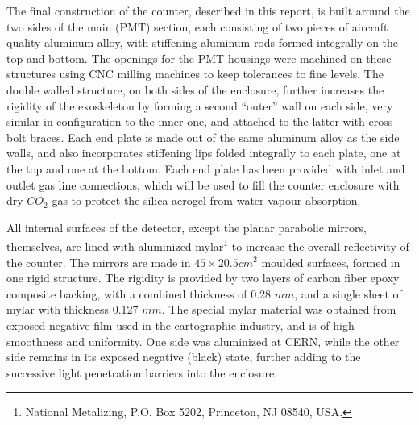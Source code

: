 The final construction of the counter, described in this report, is built
around the two sides of the main (PMT) section, each consisting of two pieces
of aircraft quality aluminum alloy, with stiffening aluminum rods formed
integrally on the top and bottom.  
The openings for the PMT housings were machined on these structures using CNC 
milling machines to keep tolerances to fine levels.  
The double walled structure, on both sides of the enclosure, further increases 
the rigidity of the exoskeleton by forming a second ``outer'' wall on each side, 
very similar in configuration to the inner one, and attached to the latter with 
cross-bolt braces.
Each end plate is made out of the same aluminum alloy as the side walls, and
also incorporates stiffening lips folded integrally to each plate, one at the
top and one at the bottom.  Each end plate has been provided with inlet and
outlet gas line connections, which will be used to fill the counter enclosure
with dry $CO_2$ gas to protect the silica aerogel from water vapour absorption.

All internal surfaces of the detector, except the planar parabolic mirrors,
themselves, are lined with aluminized 
mylar\footnote{National Metalizing, P.O. Box 5202, Princeton, NJ 08540, USA.} 
to increase the overall reflectivity of the counter.  
The mirrors are made in $45\times 20.5 cm^2$ moulded surfaces, formed in one 
rigid structure. 
The rigidity is provided by two layers of carbon fiber epoxy composite backing, 
with a combined thickness of 0.28 $mm$, and a single sheet of mylar with 
thickness 0.127 $mm$. 
The special mylar material was obtained from exposed negative film used in the
cartographic industry, and is of high smoothness and uniformity. One side was
aluminized at CERN, while the other side remains in its exposed negative
(black) state, further adding to the successive light penetration barriers into
the enclosure.  
 
